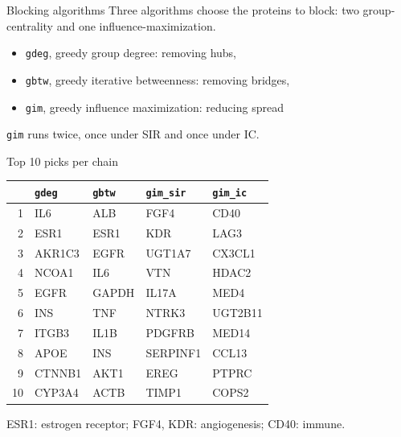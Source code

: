 \documentclass[aspectratio=169]{beamer}
\begin{document}
\begin{frame}{Blocking algorithms}
  Three algorithms choose the proteins to block: two group-centrality and one influence-maximization.

  \vspace{0.5em}

  \begin{itemize}
    \item \texttt{gdeg}, greedy group degree: removing hubs,
    \item \texttt{gbtw}, greedy iterative betweenness: removing bridges,
    \item \texttt{gim}, greedy influence maximization: reducing spread
  \end{itemize}

  \vspace{0.5em}

  \texttt{gim} runs twice, once under SIR and once under IC.
\end{frame}



\begin{frame}{Top 10 picks per chain}
  \centering
  \begin{tabular}{rllll}
    \toprule
     & \texttt{gdeg} & \texttt{gbtw} & \texttt{gim\_sir} & \texttt{gim\_ic} \\
    \midrule
    1  & IL6     & ALB   & FGF4     & CD40    \\
    2  & ESR1    & ESR1  & KDR      & LAG3    \\
    3  & AKR1C3  & EGFR  & UGT1A7   & CX3CL1  \\
    4  & NCOA1   & IL6   & VTN      & HDAC2   \\
    5  & EGFR    & GAPDH & IL17A    & MED4    \\
    6  & INS     & TNF   & NTRK3    & UGT2B11 \\
    7  & ITGB3   & IL1B  & PDGFRB   & MED14   \\
    8  & APOE    & INS   & SERPINF1 & CCL13   \\
    9  & CTNNB1  & AKT1  & EREG     & PTPRC   \\
    10 & CYP3A4  & ACTB  & TIMP1    & COPS2   \\
    \bottomrule
  \end{tabular}

  \vspace{0.4em}

  {\footnotesize ESR1: estrogen receptor; FGF4, KDR: angiogenesis; CD40: immune.}
\end{frame}
\end{document}
